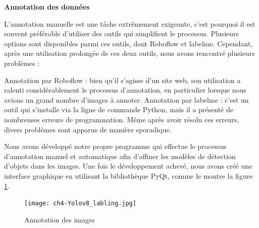 \textbf{Annotation des données}

L'annotation manuelle est une tâche extrêmement exigeante, c'est pourquoi il est souvent préférable d'utiliser des outils qui simplifient le processus. Plusieurs options sont disponibles parmi ces outils, dont Roboflow et labelme. Cependant, après une utilisation prolongée de ces deux outils, nous avons rencontré plusieurs problèmes :
\begin{outline}
    \1  Annotation par Roboflow : bien qu'il s'agisse d'un site web, son utilisation a ralenti considérablement le processus d'annotation, en particulier lorsque nous avions un grand nombre d'images à annoter.
    \1 Annotation par labelme : c'est un outil qui s'installe via la ligne de commande Python, mais il a présenté de nombreuses erreurs de programmation. Même après avoir résolu ces erreurs, divers problèmes sont apparus de manière sporadique.
\end{outline}

Nous avons développé notre propre programme qui effectue le processus d'annotation manuel et automatique afin d'affiner les modèles de détection d'objets dans les images. Une fois le développement achevé, nous avons créé une interface graphique en utilisant la bibliothèque PyQt, comme le montre la figure \ref{fig:ch4-yolo_labling_car}.

\begin{figure}[H]
	\centering
	\texttt{[image: ch4-Yolov8\_labling.jpg]}
	\caption{Annotation des images}
 \label{fig:ch4-yolo_labling_car}
\end{figure}

